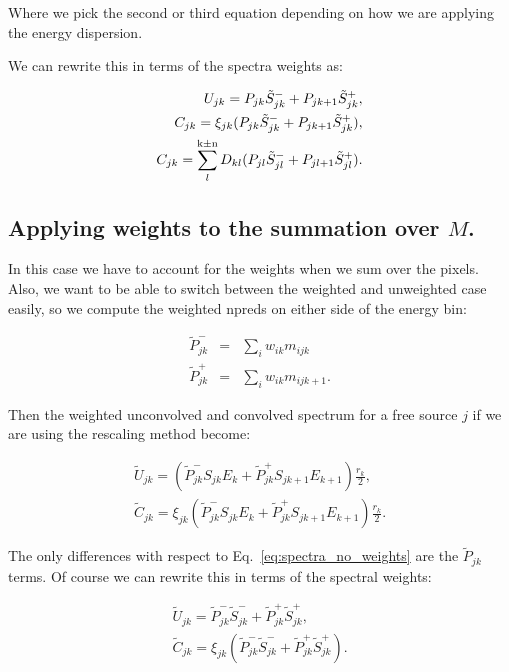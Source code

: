 \documentclass[preprint]{aastex}
\begin{document}
\noindent Where we pick the second or third equation depending on how we are applying
the energy dispersion.

We can rewrite this in terms of the spectra weights as:

\begin{eqnarray}\label{eq:spectra_no_weights}
  U_{jk} = P_{jk} \tilde{S}_{jk}^{-} + P_{jk+1} \tilde{S}_{jk}^{+},  \nonumber \\
  C_{jk} = \xi_{jk} ( P_{jk} \tilde{S}_{jk}^{-} + P_{jk+1} \tilde{S}_{jk}^{+} ), \nonumber \\
  C_{jk} = \sum_l^{\rm k\pm n} D_{kl}  (P_{jl} \tilde{S}_{jl}^{-} + P_{jl+1} \tilde{S}_{jl}^{+} ).
\end{eqnarray}


\subsection{Applying weights to the summation over \texorpdfstring{$M$}{M}.}\label{subsec:like_sum2_weights}

In this case we have to account for the weights when we sum over the
pixels.  Also, we want to be able to switch between the weighted and
unweighted case easily, so we compute the weighted npreds on either
side of the energy bin:

\begin{eqnarray}
  \tilde{P}_{jk}^{-} & = & \sum_i w_{ik} m_{ijk} \nonumber \\
  \tilde{P}_{jk}^{+} & = & \sum_i w_{ik} m_{ijk+1}. 
\end{eqnarray}

\noindent Then the weighted unconvolved and convolved spectrum for a 
free source $j$ if we are using the rescaling method become:

\begin{eqnarray}
  \tilde{U}_{jk} = ( \tilde{P}_{jk}^{-} S_{jk} E_k + \tilde{P}_{jk}^{+} S_{jk+1} E_{k+1} )  \frac{r_k}{2},  \nonumber \\
  \tilde{C}_{jk} = \xi_{jk} ( \tilde{P}_{jk}^{-} S_{jk} E_k + \tilde{P}_{jk}^{+} S_{jk+1} E_{k+1} ) \frac{r_k}{2}.
\end{eqnarray}

\noindent The only differences with respect to Eq.~\ref{eq:spectra_no_weights} 
are the $\tilde{P}_{jk}$ terms.  Of course we can rewrite this in terms of the spectral weights: 

\begin{eqnarray}
  \tilde{U}_{jk} = \tilde{P}_{jk}^{-}  \tilde{S}_{jk}^{-}  + \tilde{P}_{jk}^{+} \tilde{S}_{jk}^{+},  \nonumber \\
  \tilde{C}_{jk} = \xi_{jk} ( \tilde{P}_{jk}^{-}  \tilde{S}_{jk}^{-}  + \tilde{P}_{jk}^{+} \tilde{S}_{jk}^{+} ).
\end{eqnarray}
\end{document}
